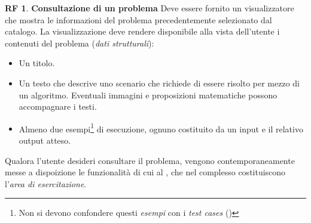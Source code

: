 \documentclass[11pt, a4paper]{article}
\theoremstyle{definition}
\newtheorem{funcreq}{RF} %
\begin{document}
\begin{funcreq}
\label{seeproblem}
\textbf{Consultazione di un problema }
Deve essere fornito un visualizzatore che mostra le informazioni del
problema precedentemente selezionato dal catalogo. La visualizzazione
deve rendere disponibile alla vista dell'utente i contenuti del
problema (\textit{dati strutturali}):
\begin{itemize}
    \item Un titolo.

    \item Un testo che descrive uno scenario che richiede di essere
    risolto per mezzo di un algoritmo. Eventuali immagini e proposizioni
    matematiche possono accompagnare i testi.

    \item Almeno due esempi\footnote{Non si devono confondere questi \textit{esempi}
    con i \textit{test cases} (\textcolor{blue}{})}
    di esecuzione, ognuno costituito da un input e il relativo output atteso.
\end{itemize}
Qualora l'utente desideri consultare il problema, vengono contemporaneamente
messe a dispoizione le funzionalità di cui al \textcolor{blue}{},
che nel complesso costituiscono l'\textit{area di esercitazione}.
\end{funcreq}
\end{document}
